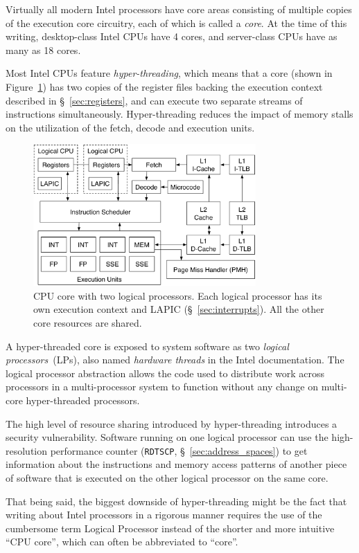Virtually all modern Intel processors have core areas consisting of multiple
copies of the execution core circuitry, each of which is called a
\textit{core}.  At the time of this writing, desktop-class Intel CPUs have 4
cores, and server-class CPUs have as many as 18 cores.

Most Intel CPUs feature \textit{hyper-threading}, which means that a core
(shown in Figure~\ref{fig:cpu_core}) has two copies of the register files
backing the execution context described in \S~\ref{sec:registers}, and can
execute two separate streams of instructions simultaneously. Hyper-threading
reduces the impact of memory stalls on the utilization of the fetch, decode and
execution units.

\begin{figure}[hbt]
  \centering
  \includegraphics[width=85mm]{figures/cpu_core.pdf}
  \caption{
    CPU core with two logical processors. Each logical processor has its own
    execution context and LAPIC (\S~\ref{sec:interrupts}). All the other core
    resources are shared.
  }
  \label{fig:cpu_core}
\end{figure}

A hyper-threaded core is exposed to system software as two \textit{logical
processors}~(LPs), also named \textit{hardware threads} in the Intel
documentation. The logical processor abstraction allows the code used to
distribute work across processors in a multi-processor system to function
without any change on multi-core hyper-threaded processors.

The high level of resource sharing introduced by hyper-threading introduces a
security vulnerability. Software running on one logical processor can use the
high-resolution performance counter (\texttt{RDTSCP},
\S~\ref{sec:address_spaces}) \cite{petters1999making} to get information about
the instructions and memory access patterns of another piece of software that
is executed on the other logical processor on the same core.

That being said, the biggest downside of hyper-threading might be the fact that
writing about Intel processors in a rigorous manner requires the use of the
cumbersome term Logical Processor instead of the shorter and more intuitive
``CPU core'', which can often be abbreviated to ``core''.
